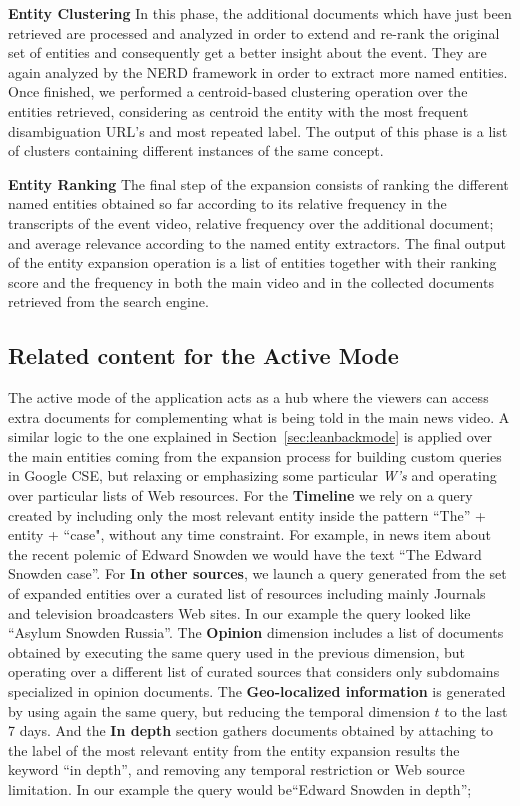\documentclass{llncs}
\begin{document}
\textbf{Entity Clustering}
In this phase, the additional documents which have just been retrieved are processed and analyzed in order to extend and re-rank the original set of entities and consequently get a better insight about the event. They are again analyzed by the NERD framework in order to extract more named entities. Once finished, we performed a centroid-based clustering operation over the entities retrieved, considering as centroid the entity with the most frequent disambiguation URL's and most repeated label. The output of this phase is a list of clusters containing different instances of the same concept.

\textbf{Entity Ranking}
The final step of the expansion consists of ranking the different named entities obtained so far according to its relative frequency in the transcripts of the event video, relative frequency over the additional document; and average relevance according to the named entity extractors. The final output of the entity expansion operation is a list of entities together with their ranking score and the frequency in both the main video and in the collected documents retrieved from the search engine.

\subsection{Related content for the Active Mode}
\label{sec:leanforwardmode}
The active mode of the application acts as a hub where the viewers can access extra documents for complementing what is being told in the main news video. A similar logic to the one explained in Section~\ref{sec:leanbackmode} is applied over the main entities coming from the expansion process for building custom queries in Google CSE, but relaxing or emphasizing some particular \emph{W's} and operating over particular lists of Web resources. For the \textbf{Timeline} we rely on a query created by including only the most relevant entity inside the pattern ``The'' + entity + ``case", without any time constraint. For example, in news item about the recent polemic of Edward Snowden we would have the text ``The Edward Snowden case''. For \textbf{In other sources}, we launch a query generated from the set of expanded entities over a curated list of resources including mainly Journals and television broadcasters Web sites. In our example the query looked like ``Asylum Snowden Russia''. The  \textbf{Opinion} dimension includes a list of documents obtained by executing the same query used in the previous dimension, but operating over a different list of curated sources that considers only subdomains specialized in opinion documents. The \textbf{Geo-localized information} is generated by using again the same query, but reducing the temporal dimension $t$ to the last 7 days. And the \textbf{In depth} section gathers documents obtained by attaching to the label of the most relevant entity from the entity expansion results the keyword ``in depth'', and removing any temporal restriction or Web source limitation. In our example the query would be``Edward Snowden in depth'';
		
\end{document}

